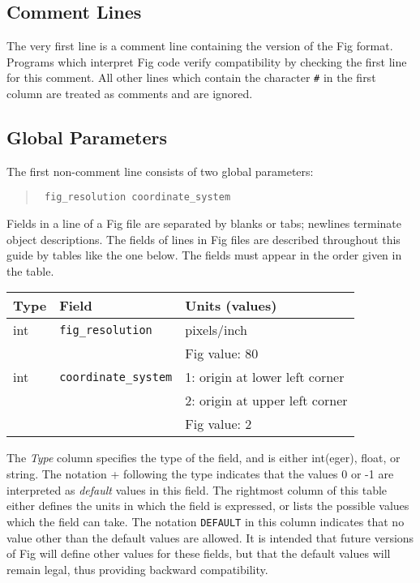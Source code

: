 \subsection{Comment Lines}
The very first line is a comment line containing the version
	of the Fig format.
Programs which interpret Fig code verify compatibility by checking
	the first line for this comment.
All other lines which contain the character \verb|#| in the first column
	are treated as comments and are ignored.

\subsection{Global Parameters}
The first non-comment line consists of two global parameters:
%
\begin{quote}
\tt
fig\_resolution coordinate\_system
\end{quote}
%
Fields in a line of a Fig file are separated by blanks or tabs;
	newlines terminate object descriptions.
The fields of lines in Fig files are described throughout this
	guide by tables like the one below.
The fields must appear in the order given in the table.
%
\vspace{2pt}
\begin{center}
\begin{tabular}{|l|l|l|}
\hline
Type 	& Field				& Units (values)		\\
\hline
\hline
int 	& {\tt fig\_resolution}		& pixels/inch			\\
	&				& Fig value: 80			\\
\hline
int	& {\tt coordinate\_system}	& 1: origin at lower left corner\\
	&				& 2: origin at upper left corner\\
	&				& Fig value: 2			\\ 
\hline
\end{tabular}
\end{center}
\vspace{2pt}

The {\em Type} column specifies the type of the field,
	and is either int(eger), float, or string.
The notation + following the type indicates that the values 0 or -1
	 are interpreted as {\em default} values in this field.
The rightmost column of this table either defines the units in which
	the field is expressed, or lists the possible values which
	the field can take.
The notation {\tt DEFAULT} in this column indicates that no value other
	than the default values are allowed.
It is intended that future versions of Fig will define other values for
	these fields, but that the default values will remain legal,
	thus providing backward compatibility.


